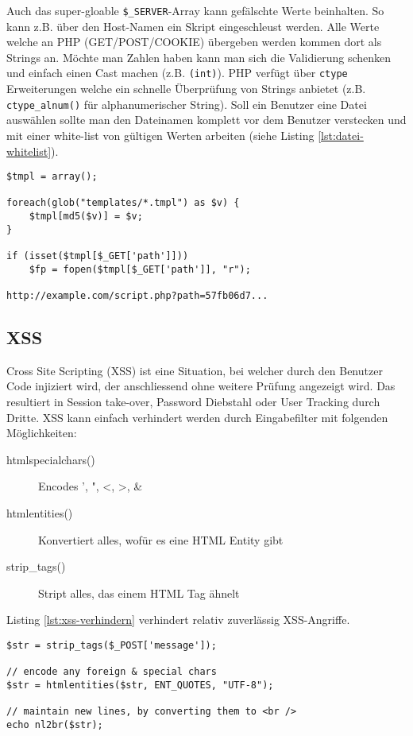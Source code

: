 Auch das super-gloable \verb|$_SERVER|-Array kann gefälschte Werte beinhalten. So kann z.B. über den Host-Namen ein Skript eingeschleust werden.
Alle Werte welche an PHP (GET/POST/COOKIE) übergeben werden kommen dort als Strings an. Möchte man Zahlen haben kann man sich die Validierung schenken und einfach einen Cast machen (z.B. \verb|(int)|). PHP verfügt über \verb|ctype| Erweiterungen welche ein schnelle Überprüfung von Strings anbietet (z.B. \verb|ctype_alnum()| für alphanumerischer String).
Soll ein Benutzer eine Datei auswählen sollte man den Dateinamen komplett vor dem Benutzer verstecken und mit einer white-list von gültigen Werten arbeiten (siehe Listing \ref{lst:datei-whitelist}).  

\begin{lstlisting}[caption=Datei Whitelist, label=lst:datei-whitelist]
$tmpl = array();

foreach(glob("templates/*.tmpl") as $v) {
	$tmpl[md5($v)] = $v;
}

if (isset($tmpl[$_GET['path']]))
	$fp = fopen($tmpl[$_GET['path']], "r");
	
http://example.com/script.php?path=57fb06d7...
\end{lstlisting}

\subsection{XSS}

Cross Site Scripting (XSS) ist eine Situation, bei welcher durch den Benutzer Code injiziert wird, der anschliessend ohne weitere Prüfung angezeigt wird. Das resultiert in Session take-over, Password Diebstahl oder User Tracking durch Dritte. XSS kann einfach verhindert werden durch Eingabefilter mit folgenden Möglichkeiten:
\begin{description}
	\item[htmlspecialchars()]  Encodes ', ", <, >, \&
	\item[htmlentities()] Konvertiert alles, wofür es eine HTML Entity gibt
	\item[strip\_tags()] Stript alles, das einem HTML Tag ähnelt
\end{description}
Listing \ref{lst:xss-verhindern} verhindert relativ zuverlässig XSS-Angriffe.
\begin{lstlisting}[caption=Verhindern von XSS, label=lst:xss-verhindern]
$str = strip_tags($_POST['message']);

// encode any foreign & special chars
$str = htmlentities($str, ENT_QUOTES, "UTF-8");

// maintain new lines, by converting them to <br />
echo nl2br($str);
\end{lstlisting}

